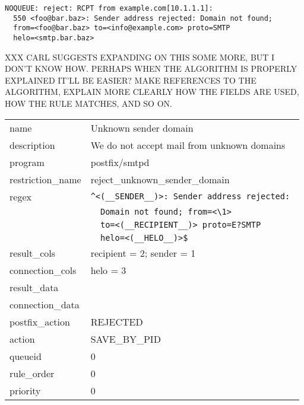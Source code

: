 \documentclass[a4paper,12pt,draft]{article}
\begin{document}
\begin{verbatim}
NOQUEUE: reject: RCPT from example.com[10.1.1.1]: 
  550 <foo@bar.baz>: Sender address rejected: Domain not found;
  from=<foo@bar.baz> to=<info@example.com> proto=SMTP
  helo=<smtp.bar.baz>
\end{verbatim}

XXX CARL SUGGESTS EXPANDING ON THIS SOME MORE, BUT I DON'T KNOW HOW\@.
PERHAPS WHEN THE ALGORITHM IS PROPERLY EXPLAINED IT'LL BE EASIER\@?  MAKE
REFERENCES TO THE ALGORITHM, EXPLAIN MORE CLEARLY HOW THE FIELDS ARE USED,
HOW THE RULE MATCHES, AND SO ON\@.

\begin{tabular}[]{ll}

name                & Unknown sender domain                             \\
description         & We do not accept mail from unknown domains        \\
program             & postfix/smtpd                                     \\
restriction\_name   & reject\_unknown\_sender\_domain                   \\
regex               & \verb!^<(__SENDER__)>: Sender address rejected: ! \\
                    & \verb!  Domain not found; from=<\1> !             \\
                    & \verb!  to=<(__RECIPIENT__)> proto=E?SMTP !       \\
                    & \verb!  helo=<(__HELO__)>$!                       \\
result\_cols        & recipient = 2; sender = 1                         \\
connection\_cols    & helo = 3                                          \\
result\_data        &                                                   \\
connection\_data    &                                                   \\
postfix\_action     & REJECTED                                          \\
action              & SAVE\_BY\_PID                                     \\
queueid             & 0                                                 \\
rule\_order         & 0                                                 \\
priority            & 0                                                 \\

\end{tabular}
\end{document}
